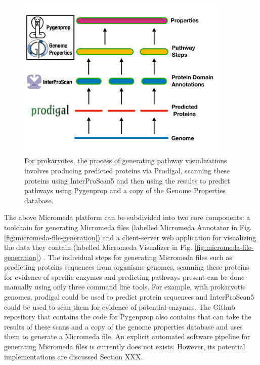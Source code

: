 \begin{figure}[!ht]
  \centering
	\includegraphics[width=0.9\textwidth]{media/micromeda-pipeline.pdf}
	 \caption{For prokaryotes, the process of generating pathway visualizations involves producing predicted proteins via Prodigal, scanning these proteins using InterProScan5 and then using the results to predict pathways using Pygenprop and a copy of the Genome Properties database.}
	 \label{fig:micromeda-levels}
\end{figure}

The above Micromeda platform can be subdivided into two core components: a toolchain for generating Micromeda files (labelled Micromeda Annotator in Fig. \ref{fig:micromeda-file-generation}) and a client-server web application for visualizing the data they contain (labelled Micromeda Visualizer in Fig. \ref{fig:micromeda-file-generation}) . The individual steps for generating Micromeda files such as predicting proteins sequences from organisms genomes, scanning these proteins for evidence of specific enzymes and predicting pathways present can be done manually using only three command line tools. For example, with prokaryotic genomes, prodigal could be used to predict protein sequences and InterProScan5 could be used to scan them for evidence of potential enzymes. The Github repository that contains the code for Pygenprop also contains that can take the results of these scans and a copy of the genome properties database and uses them to generate a Micromeda file. An explicit automated software pipeline for generating Micromeda files is currently does not exists. However, its potential implementations are discussed Section XXX. 

